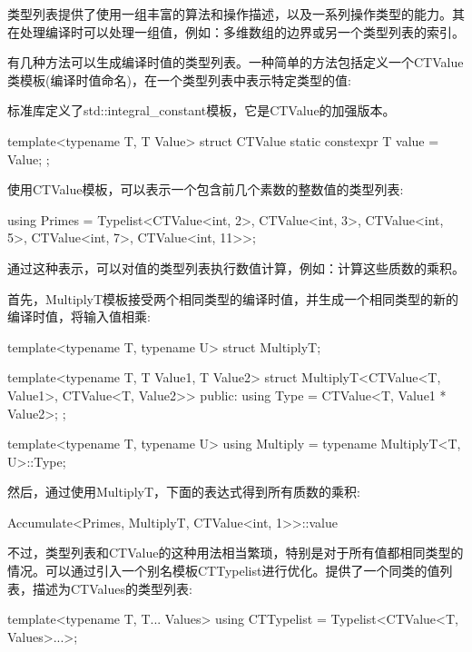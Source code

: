 
类型列表提供了使用一组丰富的算法和操作描述，以及一系列操作类型的能力。其在处理编译时可以处理一组值，例如：多维数组的边界或另一个类型列表的索引。

有几种方法可以生成编译时值的类型列表。一种简单的方法包括定义一个CTValue类模板(编译时值命名)，在一个类型列表中表示特定类型的值:

\begin{notice}标准库定义了std::integral\_constant模板，它是CTValue的加强版本。
\end{notice}

\begin{cpp}
template<typename T, T Value>
struct CTValue
{
	static constexpr T value = Value;
};
\end{cpp}

使用CTValue模板，可以表示一个包含前几个素数的整数值的类型列表:

\begin{cpp}
using Primes = Typelist<CTValue<int, 2>, CTValue<int, 3>,
						CTValue<int, 5>, CTValue<int, 7>,
						CTValue<int, 11>>;
\end{cpp}

通过这种表示，可以对值的类型列表执行数值计算，例如：计算这些质数的乘积。

首先，MultiplyT模板接受两个相同类型的编译时值，并生成一个相同类型的新的编译时值，将输入值相乘:

\begin{cpp}
template<typename T, typename U>
struct MultiplyT;

template<typename T, T Value1, T Value2>
struct MultiplyT<CTValue<T, Value1>, CTValue<T, Value2>> {
	public:
	using Type = CTValue<T, Value1 * Value2>;
};

template<typename T, typename U>
using Multiply = typename MultiplyT<T, U>::Type;
\end{cpp}

然后，通过使用MultiplyT，下面的表达式得到所有质数的乘积:

\begin{cpp}
Accumulate<Primes, MultiplyT, CTValue<int, 1>>::value
\end{cpp}

不过，类型列表和CTValue的这种用法相当繁琐，特别是对于所有值都相同类型的情况。可以通过引入一个别名模板CTTypelist进行优化。提供了一个同类的值列表，描述为CTValues的类型列表:

\begin{cpp}
template<typename T, T... Values>
using CTTypelist = Typelist<CTValue<T, Values>...>;
\end{cpp}

